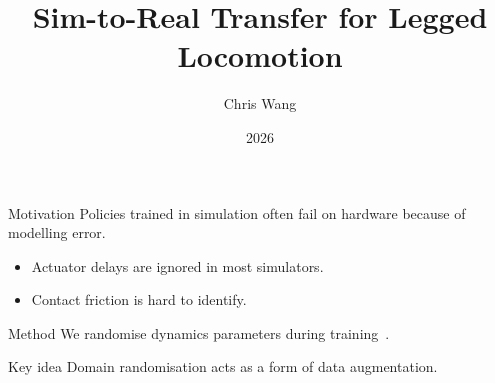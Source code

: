 \documentclass[aspectratio=169]{beamer}
\title{Sim-to-Real Transfer for Legged Locomotion}
\author{Chris Wang}
\institute{ETH Zurich}
\date{2026}
\begin{document}
\begin{frame}
  \titlepage
\end{frame}
\begin{frame}{Motivation}
  Policies trained in simulation often fail on hardware because of modelling error.
  \begin{itemize}
    \item Actuator delays are ignored in most simulators.
    \item Contact friction is hard to identify.
  \end{itemize}
\end{frame}
\begin{frame}{Method}
  We randomise dynamics parameters during training~\cite{lee2021}.
  \begin{block}{Key idea}
    Domain randomisation acts as a form of data augmentation.
  \end{block}
\end{frame}
\end{document}

